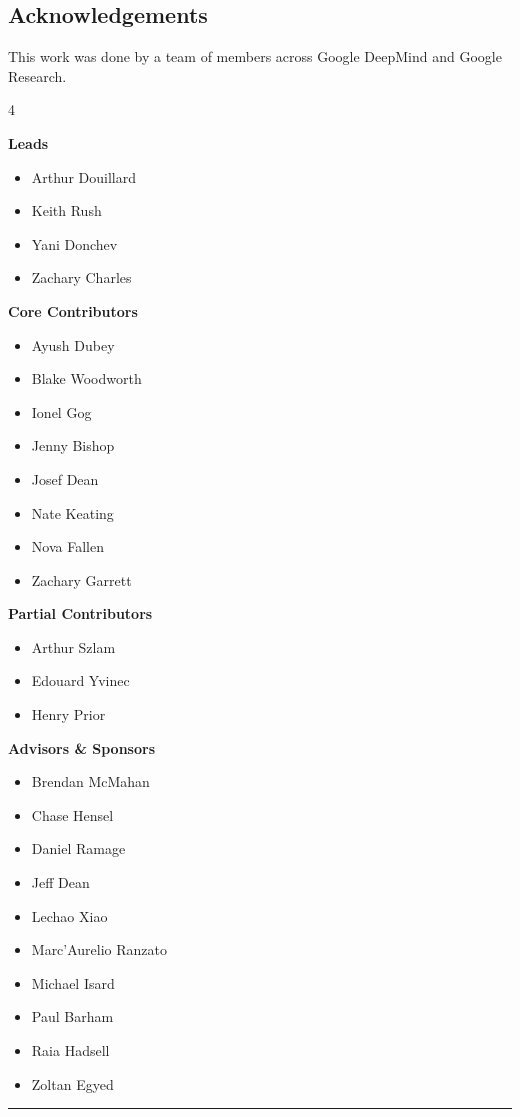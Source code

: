 \documentclass[11pt, a4paper, twocolumn, copyright, google]{google}
\begin{document}
\begin{strip}
\section*{Acknowledgements}

This work was done by a team of members across Google DeepMind and Google Research.

\begin{multicols}{4}

\noindent \textbf{Leads}
\begin{itemize}[label={}, leftmargin=0pt, nosep]
    \item Arthur Douillard
    \item Keith Rush
    \item Yani Donchev
    \item Zachary Charles
\end{itemize}
\columnbreak 

\noindent \textbf{Core Contributors}
\begin{itemize}[label={}, leftmargin=0pt, nosep]
    \item Ayush Dubey
    \item Blake Woodworth
    \item Ionel Gog
    \item Jenny Bishop
    \item Josef Dean
    \item Nate Keating
    \item Nova Fallen
    \item Zachary Garrett
\end{itemize}
\columnbreak 

\noindent \textbf{Partial Contributors}
\begin{itemize}[label={}, leftmargin=0pt, nosep]
    \item Arthur Szlam
    \item Edouard Yvinec
    \item Henry Prior
\end{itemize}
\columnbreak 

\noindent \textbf{Advisors \& Sponsors}
\begin{itemize}[label={}, leftmargin=0pt, nosep]
    \item Brendan McMahan
    \item Chase Hensel
    \item Daniel Ramage
    \item Jeff Dean
    \item Lechao Xiao
    \item Marc'Aurelio Ranzato
    \item Michael Isard
    \item Paul Barham
    \item Raia Hadsell
    \item Zoltan Egyed
\end{itemize}

\end{multicols}
\vspace{0.5cm} %
\hrule %
\end{strip}
\end{document}
